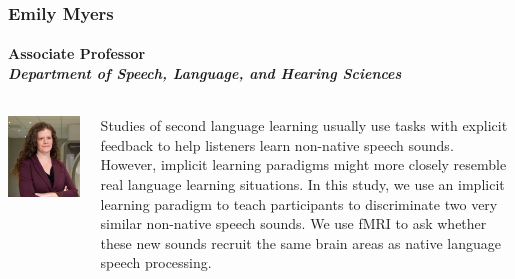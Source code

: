 \documentclass[aspectratio=169]{beamer}
\begin{document}
\begin{frame}
	\frametitle{Emily Myers}
	\framesubtitle{Associate Professor\\ \textit{Department of Speech, Language, and Hearing Sciences} }

	\begin{columns}[T]
		\begin{column}{.25\textwidth}
			\includegraphics[width=\textwidth]{img/myers.png}
		\end{column}

		\begin{column}{.75\textwidth}
			Studies of second language learning usually use tasks with explicit feedback to help listeners learn non-native speech sounds. However, implicit learning paradigms might more closely resemble real language learning situations. In this study, we use an implicit learning paradigm to teach participants to discriminate two very similar non-native speech sounds. We use fMRI to ask whether these new sounds recruit the same brain areas as native language speech processing.
		\end{column}
	\end{columns}
\end{frame}
\end{document}
